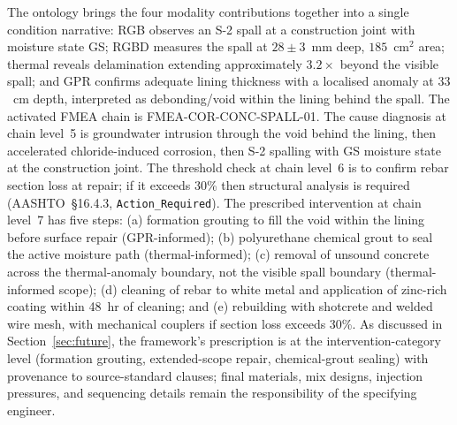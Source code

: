 \documentclass[11pt,a4paper]{article}
\begin{document}
The ontology brings the four modality contributions together into a single condition narrative: RGB observes an S-2 spall at a construction joint with moisture state GS; RGBD measures the spall at $28\pm3$~mm deep, $185$~cm$^2$ area; thermal reveals delamination extending approximately $3.2\times$ beyond the visible spall; and GPR confirms adequate lining thickness with a localised anomaly at $33$~cm depth, interpreted as debonding/void within the lining behind the spall. The activated FMEA chain is FMEA-COR-CONC-SPALL-01. The cause diagnosis at chain level~5 is groundwater intrusion through the void behind the lining, then accelerated chloride-induced corrosion, then S-2 spalling with GS moisture state at the construction joint. The threshold check at chain level~6 is to confirm rebar section loss at repair; if it exceeds 30\% then structural analysis is required (AASHTO~\S16.4.3, \texttt{Action\_Required}). The prescribed intervention at chain level~7 has five steps: (a) formation grouting to fill the void within the lining before surface repair (GPR-informed); (b) polyurethane chemical grout to seal the active moisture path (thermal-informed); (c) removal of unsound concrete across the thermal-anomaly boundary, not the visible spall boundary (thermal-informed scope); (d) cleaning of rebar to white metal and application of zinc-rich coating within 48~hr of cleaning; and (e) rebuilding with shotcrete and welded wire mesh, with mechanical couplers if section loss exceeds 30\%. As discussed in Section~\ref{sec:future}, the framework's prescription is at the intervention-category level (formation grouting, extended-scope repair, chemical-grout sealing) with provenance to source-standard clauses; final materials, mix designs, injection pressures, and sequencing details remain the responsibility of the specifying engineer.
\end{document}
